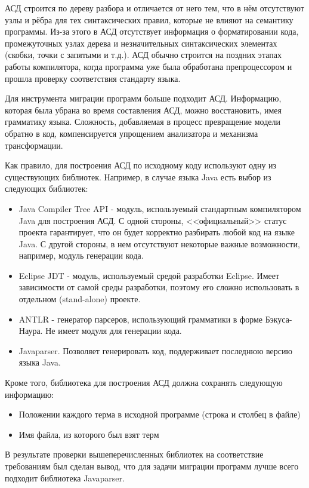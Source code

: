 АСД строится по дереву разбора и отличается от него тем, что в нём отсутствуют узлы и рёбра для тех синтаксических правил, которые не влияют на семантику программы. Из-за этого в АСД отсутствует информация о форматировании кода, промежуточных узлах дерева и незначительных синтаксических элементах (скобки, точки с запятыми и т.д.). АСД обычно строится на поздних этапах работы компилятора, когда программа уже была обработана препроцессором и прошла проверку соответствия стандарту языка.

Для инструмента миграции программ больше подходит АСД. Информацию, которая была убрана во время составления АСД, можно восстановить, имея грамматику языка. Сложность, добавляемая в процесс превращение модели обратно в код, компенсируется упрощением анализатора и механизма трансформации.

Как правило, для построения АСД по исходному коду используют одну из существующих библиотек. Например, в случае языка Java есть выбор из следующих библиотек:

\begin{itemize}
\item Java Compiler Tree API - модуль, используемый стандартным компилятором Java для построения АСД. С одной стороны, <<официальный>> статус проекта гарантирует, что он будет корректно разбирать любой код на языке Java. С другой стороны, в нем отсутствуют некоторые важные возможности, например, модуль генерации кода.
\item Eclipse JDT - модуль, используемый средой разработки Eclipse. Имеет зависимости от самой среды разработки, поэтому его сложно использовать в отдельном (stand-alone) проекте.
\item ANTLR - генератор парсеров, использующий грамматики в форме Бэкуса-Наура. Не имеет модуля для генерации кода.
\item Javaparser. Позволяет генерировать код, поддерживает последнюю версию языка Java.
\end{itemize}

Кроме того, библиотека для построения АСД должна сохранять следующую информацию:
\begin{itemize}
\item Положении каждого терма в исходной программе (строка и столбец в файле)
\item Имя файла, из которого был взят терм
\end{itemize}

В результате проверки вышеперечисленных библиотек на соответствие требованиям был сделан вывод, что для задачи миграции программ лучше всего подходит библиотека Javaparser.

